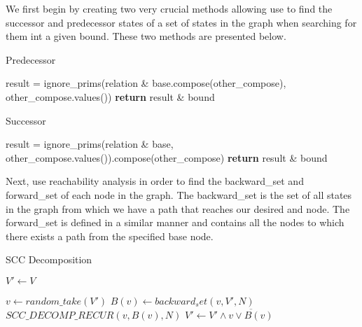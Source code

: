 \documentclass[11pt]{article}
\begin{document}
        We first begin by creating two very crucial methods allowing use to find
        the successor and predecessor states of a set of states in the graph when
        searching for them int a given bound. These two methods are presented 
        below.

        \begin{multicols}{2}
        \begin{algorithm}[H]
            \caption{Predecessor}\label{predecessor}
                \State result = ignore\_prims(relation \& base.compose(other\_compose), other\_compose.values())
                \State \textbf{return} result & bound
            \EndProcedure
        \end{algorithm}
        \begin{algorithm}[H]
            \caption{Successor}\label{successor}
                \State result = ignore\_prims(relation \& base, other\_compose.values()).compose(other\_compose)
                \State \textbf{return} result & bound
            \EndProcedure
        \end{algorithm}
        \end{multicols}

        Next, use reachability analysis in order to find the backward\_set
        and forward\_set of each node in the graph. The backward\_set is 
        the set of all states in the graph from which we have a path that
        reaches our desired and node. The forward\_set is defined in a similar
        manner and contains all the nodes to which there exists a path from
        the specified base node.

        \begin{algorithm}[H]
            \caption{SCC Decomposition}\label{scc}
                \State $V' \gets V$

                    \State $v \gets random\_take(V')$
                    \State $B(v) \gets backward_set(v, V', N)$
                    \State $SCC\_DECOMP\_RECUR(v, B(v), N)$
                    \State $V' \gets V' \wedge \overline{v \vee B(v)}$
                \EndWhile
            \EndProcedure
        \end{algorithm}
\end{document}
